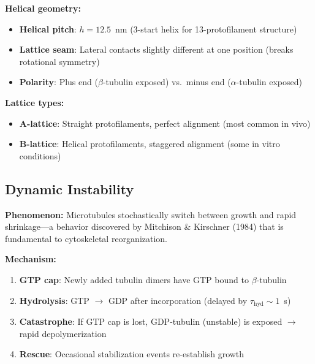 \textbf{Helical geometry:}
\begin{itemize}
\item \textbf{Helical pitch}: $h = 12.5$~nm (3-start helix for 13-protofilament structure)
\item \textbf{Lattice seam}: Lateral contacts slightly different at one position (breaks rotational symmetry)
\item \textbf{Polarity}: Plus end ($\beta$-tubulin exposed) vs.~minus end ($\alpha$-tubulin exposed)
\end{itemize}

\textbf{Lattice types:}
\begin{itemize}
\item \textbf{A-lattice}: Straight protofilaments, perfect alignment (most common in vivo)
\item \textbf{B-lattice}: Helical protofilaments, staggered alignment (some in vitro conditions)
\end{itemize}

\subsection{Dynamic Instability}

\textbf{Phenomenon:} Microtubules stochastically switch between growth and rapid shrinkage---a behavior discovered by Mitchison \& Kirschner (1984) that is fundamental to cytoskeletal reorganization.

\textbf{Mechanism:}
\begin{enumerate}
\item \textbf{GTP cap}: Newly added tubulin dimers have GTP bound to $\beta$-tubulin
\item \textbf{Hydrolysis}: GTP $\rightarrow$ GDP after incorporation (delayed by $\tau_{\mathrm{hyd}} \sim 1$~s)
\item \textbf{Catastrophe}: If GTP cap is lost, GDP-tubulin (unstable) is exposed $\rightarrow$ rapid depolymerization
\item \textbf{Rescue}: Occasional stabilization events re-establish growth
\end{enumerate}


